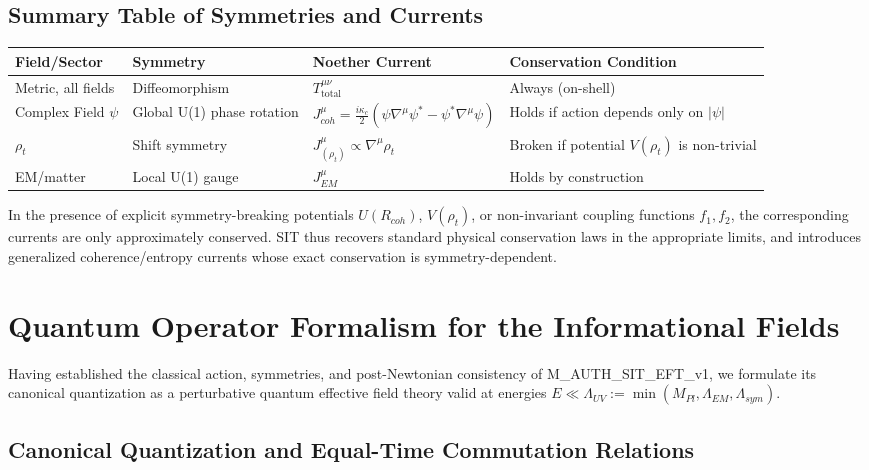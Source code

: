 \documentclass[american,11pt,letterpaper]{article}
\def\mathrm#1{#1}%
\def\texttt#1{#1}%
\begin{document}
\subsection{Summary Table of Symmetries and Currents}
\begin{center}
\small
\begin{tabular}{|p{}|p{}|p{}|p{}|}
\hline
\textbf{Field/Sector} & \textbf{Symmetry} & \textbf{Noether Current} & \textbf{Conservation Condition} \\
\hline
Metric, all fields & Diffeomorphism & $T^{\mu\nu}_{\text{total}}$ & Always (on-shell) \\
Complex Field $\psi$ & Global U(1) phase rotation & $J^\mu_{\mathrm{coh}} = \frac{i\kappa_c}{2}(\psi\nabla^\mu\psi^* - \psi^*\nabla^\mu\psi)$ & Holds if action depends only on $|\psi|$ \\
$\rho_t$ & Shift symmetry & $J^\mu_{(\rho_t)} \propto \nabla^\mu \rho_t$ & Broken if potential $V(\rho_t)$ is non-trivial \\
EM/matter & Local U(1) gauge & $J^\mu_{\mathrm{EM}}$ & Holds by construction \\
\hline
\end{tabular}
\end{center}

\noindent
In the presence of explicit symmetry-breaking potentials $U(R_{\mathrm{coh}})$, $V(\rho_t)$, or non-invariant coupling functions $f_1, f_2$, the corresponding currents are only approximately conserved. SIT thus recovers standard physical conservation laws in the appropriate limits, and introduces generalized coherence/entropy currents whose exact conservation is symmetry-dependent.



\section{Quantum Operator Formalism for the Informational Fields}
\label{sec:quantum-operator-formalism}
\label{sec:path-int}

Having established the classical action, symmetries, and post-Newtonian consistency of \texttt{M\_AUTH\_SIT\_EFT\_v1}, we formulate its canonical quantization as a perturbative quantum effective field theory valid at energies $E \ll \Lambda_{\mathrm{UV}} := \min(M_{\mathrm{Pl}}, \Lambda_{\mathrm{EM}}, \Lambda_{\mathrm{sym}})$.

\subsection{Canonical Quantization and Equal-Time Commutation Relations}
\end{document}
